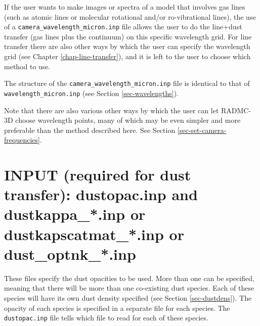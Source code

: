 \documentclass{report}
\begin{document}
If the user wants to make images or spectra of a model that involves gas
lines (such as atomic lines or molecular rotational and/or ro-vibrational
lines), the use of a {\small\tt camera\_wavelength\_micron.inp} file allows
the user to do the line+dust transfer (gas lines plus the continuum) on this
specific wavelength grid. For line transfer there are also other ways by
which the user can specify the wavelength grid (see Chapter
\ref{chap-line-transfer}), and it is left to the user to choose which method
to use.

The structure of the {\small\tt camera\_wavelength\_micron.inp} file is
identical to that of {\small\tt wavelength\_micron.inp} (see Section
\ref{sec-wavelengths}).

Note that there are also various other ways by which the user can let
RADMC-3D choose wavelength points, many of which may be even simpler
and more preferable than the method described here. See Section
\ref{sec-set-camera-frequencies}.



\section{INPUT (required for dust transfer): dustopac.inp and dustkappa\_*.inp or dustkapscatmat\_*.inp or dust\_optnk\_*.inp}
\label{sec-opacities}
These files specify the dust opacities to be used. More than one can be
specified, meaning that there will be more than one co-existing dust
species. Each of these species will have its own dust density specified
(see Section \ref{sec-dustdens}). The opacity of each species is specified
in a separate file for each species. The {\small\tt dustopac.inp} file tells which 
file to read for each of these species.
\end{document}
